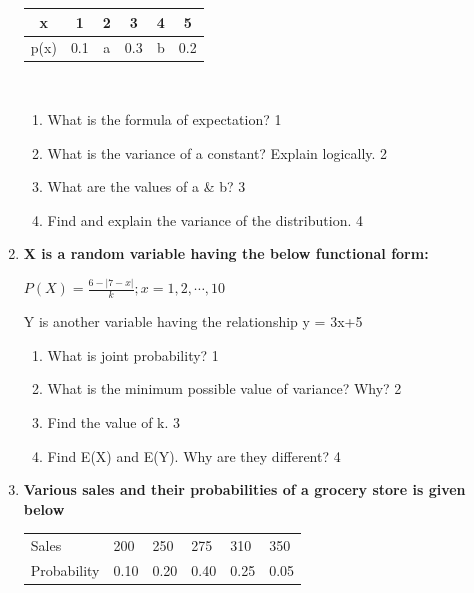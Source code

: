 \documentclass[a4paper,oneside]{book}
\begin{document}
\begin{enumerate}
	  \begin{table}[h]
	  \begin{center}
\begin{tabular}{c|c|c|c|c|c}
x    & 1   & 2 & 3   & 4 & 5   \\ \hline
p(x) & 0.1 & a & 0.3 & b & 0.2 
\end{tabular} \\
\end{center}	
\end{table}
    
  \begin{enumerate}
    \item
	What is the formula of expectation? \hfill 1
    \item
	What is the variance of a constant? Explain logically. \hfill 2
    \item  
	What are the values of a \& b? \hfill 3
    \item
	Find and explain the variance of the distribution. \hfill 4
  \end{enumerate}
  
       \item
	  \textbf{X is a random variable having the below functional form:} 
  
  \begin{center}
  $P(X) = \frac{6-|7-x|}{k}; x = 1, 2, \cdots,10$ \\
  \end{center}  
  
  Y is another variable having the relationship y = 3x+5
  
  \begin{enumerate}
    \item
	What is joint probability? \hfill 1
    \item
	What is the minimum possible value of variance? Why? \hfill 2
    \item  
	Find the value of k. \hfill 3
    \item
	Find E(X) and E(Y). Why are they different? \hfill 4
  \end{enumerate}
  
       \item
  \textbf{Various sales and their probabilities of a grocery store is given below}
  
  \begin{table}[h]
  \centering
\begin{tabular}{llllll}
Sales & 200 & 250 & 275 & 310 & 350 \\
Probability & 0.10 & 0.20 & 0.40 & 0.25 & 0.05
\end{tabular}
\end{table}


\end{enumerate}
\end{document}
